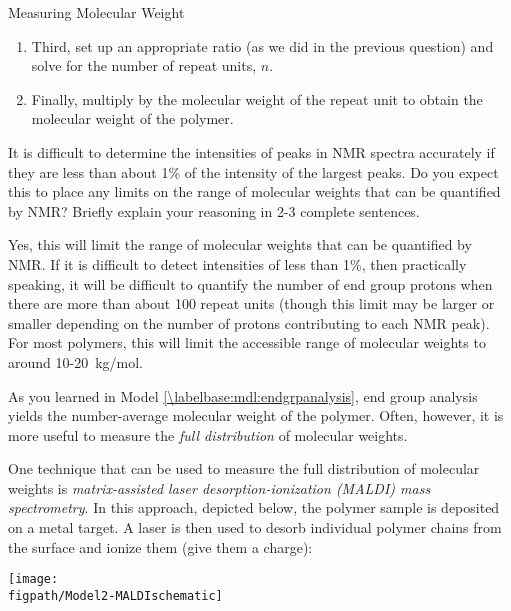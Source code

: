 \begin{activity}{Measuring Molecular Weight}
\begin{ctqs}
\begin{solution}[2in]
\begin{enumerate}
					\item Third, set up an appropriate ratio (as we did in the previous question) and solve for the number of repeat units, $n$.
				
					\item Finally, multiply by the molecular weight of the repeat unit to obtain the molecular weight of the polymer.
				\end{enumerate}
				 
			\end{solution}
		
		\question It is difficult to determine the intensities of peaks in NMR spectra accurately if they are less than about 1\% of the intensity of the largest peaks.  Do you expect this to place any limits on the range of molecular weights that can be quantified by NMR?  Briefly explain your reasoning in 2-3 complete sentences.
		
			\begin{solution}[2in]
				Yes, this will limit the range of molecular weights that can be quantified by NMR.  If it is difficult to detect intensities of less than 1\%, then practically speaking, it will be difficult to quantify the number of end group protons when there are more than about 100 repeat units (though this limit may be larger or smaller depending on the number of protons contributing to each NMR peak).  For most polymers, this will limit the accessible range of molecular weights to around 10-20~kg/mol.
			\end{solution}
	
\end{ctqs}



\begin{model}
	\label{\labelbase:mdl:MALDI}

	As you learned in Model \ref{\labelbase:mdl:endgrpanalysis}, end group analysis yields the number-average molecular weight of the polymer.  Often, however, it is more useful to measure the \emph{full distribution} of molecular weights.
	
	One technique that can be used to measure the full distribution of molecular weights is \emph{matrix-assisted laser desorption-ionization (MALDI) mass spectrometry}.  In this approach, depicted below, the polymer sample is deposited on a metal target.  A laser is then used to desorb individual polymer chains from the surface and ionize them (give them a charge):   
	
	\vspace{12pt}
	\centerline{\texttt{[image: \\figpath/Model2-MALDIschematic]}}
	

\end{model}
\end{activity}
